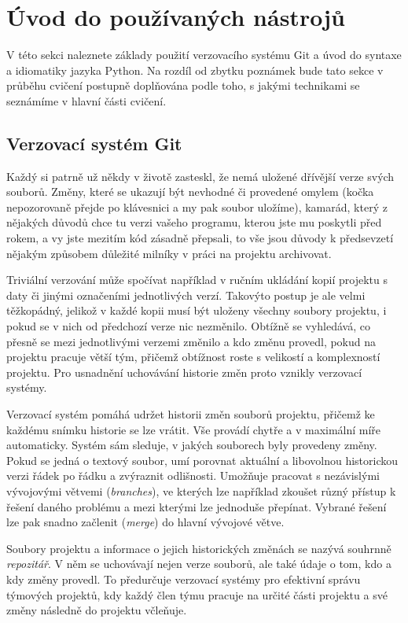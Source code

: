 \documentclass[a4paper,11pt,twoside]{article}
\theoremstyle{red}
\theoremstyle{green}
\begin{document}
\section{Úvod do používaných nástrojů}
    V této sekci naleznete základy použití verzovacího systému Git a úvod do syntaxe a idiomatiky jazyka Python.
    Na rozdíl od zbytku poznámek bude tato sekce v průběhu cvičení postupně doplňována podle toho, s jakými technikami se seznámíme v hlavní části cvičení.

\subsection{Verzovací systém Git}
    Každý si patrně už někdy v životě zasteskl, že nemá uložené dřívější verze svých souborů.
    Změny, které se ukazují být nevhodné či provedené omylem (kočka nepozorovaně přejde po klávesnici a my pak soubor uložíme), kamarád, který z nějakých důvodů chce tu verzi vašeho programu, kterou jste mu poskytli před rokem, a vy jste mezitím kód zásadně přepsali, to vše jsou důvody k předsevzetí nějakým způsobem důležité milníky v práci na projektu archivovat.

    Triviální verzování může spočívat například v ručním ukládání kopií projektu s daty či jinými označeními jednotlivých verzí.
    Takovýto postup je ale velmi těžkopádný, jelikož v každé kopii musí být uloženy všechny soubory projektu, i pokud se v nich od předchozí verze nic nezměnilo.
    Obtížně se vyhledává, co přesně se mezi jednotlivými verzemi změnilo a kdo změnu provedl, pokud na projektu pracuje větší tým, přičemž obtížnost roste s velikostí a komplexností projektu.
    Pro usnadnění uchovávání historie změn proto vznikly verzovací systémy.    

    Verzovací systém pomáhá udržet historii změn souborů projektu, přičemž ke každému snímku historie se lze vrátit.
    Vše provádí chytře a v maximální míře automaticky.
    Systém sám sleduje, v jakých souborech byly provedeny změny.
    Pokud se jedná o textový soubor, umí porovnat aktuální a libovolnou historickou verzi řádek po řádku a zvýraznit odlišnosti.
    Umožňuje pracovat s nezávislými vývojovými větvemi (\emph{branches}), ve kterých lze například zkoušet různý přístup k řešení daného problému a mezi kterými lze jednoduše přepínat.
    Vybrané řešení lze pak snadno začlenit (\emph{merge}) do hlavní vývojové větve.

    Soubory projektu a informace o jejich historických změnách se nazývá souhrnně \emph{repozitář}.
    V něm se uchovávají nejen verze souborů, ale také údaje o tom, kdo a kdy změny provedl.
    To předurčuje verzovací systémy pro efektivní správu týmových projektů, kdy každý člen týmu pracuje na určité části projektu a své změny následně do projektu včleňuje.
\end{document}
